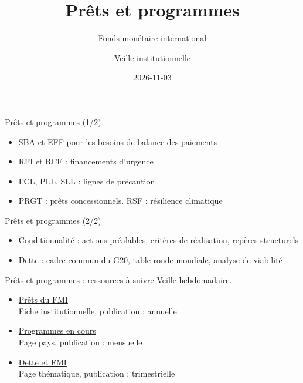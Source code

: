\documentclass[aspectratio=169,11pt]{beamer}
\title{Prêts et programmes}
\subtitle{Fonds monétaire international}
\author{Veille institutionnelle}
\date{2026-11-03}
\begin{document}
\begin{frame}\titlepage\end{frame}

\begin{frame}{Prêts et programmes (1/2)}
\begin{itemize}
\item SBA et EFF pour les besoins de balance des paiements
\item RFI et RCF : financements d'urgence
\item FCL, PLL, SLL : lignes de précaution
\item PRGT : prêts concessionnels. RSF : résilience climatique
\end{itemize}
\end{frame}

\begin{frame}{Prêts et programmes (2/2)}
\begin{itemize}
\item Conditionnalité : actions préalables, critères de réalisation, repères structurels
\item Dette : cadre commun du G20, table ronde mondiale, analyse de viabilité
\end{itemize}
\end{frame}

\begin{frame}{Prêts et programmes : ressources à suivre}
\small
Veille hebdomadaire.
\begin{itemize}
\item \href{https://www.imf.org/en/About/Factsheets/Sheets/2023/IMF-Lending}{Prêts du FMI}\\{\footnotesize Fiche institutionnelle, publication : annuelle}
\item \href{https://www.imf.org/en/Countries/ResRep}{Programmes en cours}\\{\footnotesize Page pays, publication : mensuelle}
\item \href{https://www.imf.org/en/Topics/imf-and-debt}{Dette et FMI}\\{\footnotesize Page thématique, publication : trimestrielle}
\end{itemize}
\end{frame}
\end{document}
